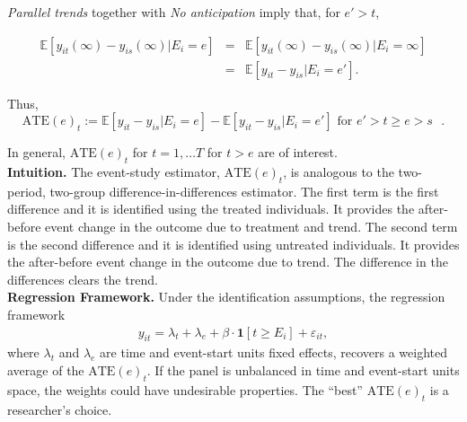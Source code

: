 \noindent \textit{Parallel trends} together with \textit{No anticipation} imply that, for $e' > t$, 

\begin{eqnarray}
\mathbb{E} \left[ y_{it} \left( \infty \right) - y_{is} \left( \infty \right) | E_{i} = e \right] &=& \mathbb{E} \left[ y_{it} \left( \infty \right) - y_{is} \left( \infty \right) | E_{i} = \infty \right] \nonumber \\ 
&=& \mathbb{E} \left[ y_{it}  - y_{is} | E_{i} = e' \right]. \label{eq:parallel}
\end{eqnarray}

\noindent Thus, 
\begin{equation}
\text{ATE} \left( e \right)_{t}:= \mathbb{E} \left[ y_{it} - y_{is} | E_{i} = e \right] - \mathbb{E} \left[ y_{it}  - y_{is} | E_{i} = e' \right] \text{ for $e' > t \geq e > s$ }.
\end{equation}

\noindent In general, $\text{ATE} \left( e \right)_{t}$ for $t = 1, \ldots T$ for $t > e$ are of interest.\\

\noindent \textbf{Intuition.} The event-study estimator, $\text{ATE} \left( e \right)_{t}$, is analogous to the two-period, two-group difference-in-differences estimator. The first term is the first difference and it is identified using the treated individuals. It provides the after-before event change in the outcome due to treatment and trend. The second term is the second difference and it is identified using untreated individuals. It provides the after-before event change in the outcome due to trend. The difference in the differences clears the trend.\\

\noindent \textbf{Regression Framework.} Under the identification assumptions, the regression framework 
\begin{eqnarray}
y_{it} = \lambda_{t} + \lambda_{e} + \beta \cdot \bm{1} \left[ t \geq E_{i} \right] + \varepsilon_{it}, 
\end{eqnarray}
\noindent where $\lambda_{t}$ and $\lambda_{e}$ are time and event-start units fixed effects, recovers a weighted average of the $\text{ATE} \left( e \right)_{t}$. If the panel is unbalanced in time and event-start units space, the weights could have undesirable properties. The ``best''  $\text{ATE} \left( e \right)_{t}$ is a researcher's choice. 

